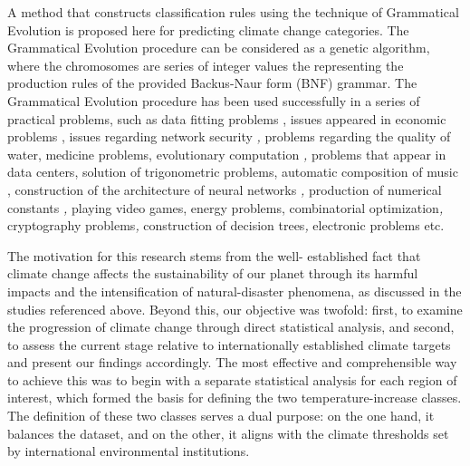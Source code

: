 \documentclass[12pt]{Definitions/academia}
\begin{document}
A method that constructs classification rules using the technique
of Grammatical Evolution \textit{\cite{O'Neill 2002}} is proposed
here for predicting climate change categories. The Grammatical Evolution
procedure can be considered as a genetic algorithm\textit{\cite{Kramer 2017}},
where the chromosomes are series of integer values the representing
the production rules of the provided Backus-Naur form (BNF) grammar\textit{\cite{Backus 1959}}.
The Grammatical Evolution procedure has been used successfully in
a series of practical problems, such as data fitting problems \textit{\cite{Ryan 1998,Neill 1999}},
issues appeared in economic problems \textit{\cite{Brabazon 2006}},
issues regarding network security \textit{\cite{Sen 2009},} problems
regarding the quality of water\textit{\cite{Chen 2008}}, medicine
problems\textit{\cite{Hidalgo 2014}}, evolutionary computation \textit{\cite{Tavares 2012},}
problems that appear in data centers\textit{\cite{Zapater 2016}},
solution of trigonometric problems\textit{\cite{Ryan 1998-1}}, automatic
composition of music \textit{\cite{de la Puente 2002}}, construction
of the architecture of neural networks \textit{\cite{De Campos 2016,Soltanian 2022},}
production of numerical constants \textit{\cite{Dempsey 2007},} playing
video games\textit{\cite{Galv=0000E1n-L=0000F3pez 2010,Shaker 2012}},
energy problems\textit{\cite{Mart=0000EDnez=002010Rodr=0000EDguez 2020}},
combinatorial optimization\textit{\cite{Sabar 2013},} cryptography
problems\textit{\cite{Ryan 2022},} construction of decision trees\textit{\cite{Pereira 2021},}
electronic problems\textit{\cite{Castej=0000F3n 2018} }etc.


{The motivation for this research stems from the well- established fact that climate change affects the sustainability of our planet through its harmful impacts and the intensification of natural-disaster phenomena, as discussed in the studies referenced above. Beyond this, our objective was twofold: first, to examine the progression of climate change through direct statistical analysis, and second, to assess the current stage relative to internationally established climate targets and present our findings accordingly.
The most effective and comprehensible way to achieve this was to begin with a separate statistical analysis for each region of interest, which formed the basis for defining the two temperature-increase classes. The definition of these two classes serves a dual purpose: on the one hand, it balances the dataset, and on the other, it aligns with the climate thresholds set by international environmental institutions.}
\end{document}
